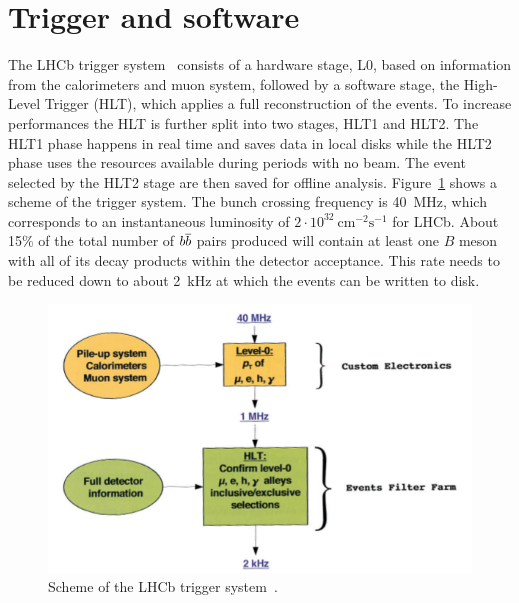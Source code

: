 \section{Trigger and software}
\label{sec:det_trigger}

The LHCb trigger system~\cite{LHCb-DP-2012-004} consists of a hardware stage, L0, based on information
from the calorimeters and muon system, followed by a software stage, the High-Level Trigger (HLT), which applies 
a full reconstruction of the events. To increase performances the HLT is further split into two stages, HLT1 and HLT2.
The HLT1 phase happens in real time and saves data in local disks while the HLT2 phase uses the resources
available during periods with no beam. The event selected by the HLT2 stage are then saved for offline analysis.
Figure~\ref{fig:triggerscheme} shows a scheme of the trigger system.
The bunch crossing frequency is 40~$\mbox{MHz}$, which corresponds to an instantaneous luminosity of 
$2 \cdot 10^{32} ~\mbox{cm}^{-2} \mbox{s}^{-1}$ for LHCb. About 15\% of the total number of
$b\overline {b}$ pairs produced will contain at least one $B$ meson with all of its decay products 
within the detector acceptance. This rate needs to be reduced down to about 2~kHz at which the events
can be written to disk. 
%
\begin{figure}[h!]
\centering 
\includegraphics[width=0.9\linewidth]{Detector/figs/triggerscheme.png}
\caption{Scheme of the LHCb trigger system~\cite{Alves:2008zz}.}
\label{fig:triggerscheme}
\end{figure}

